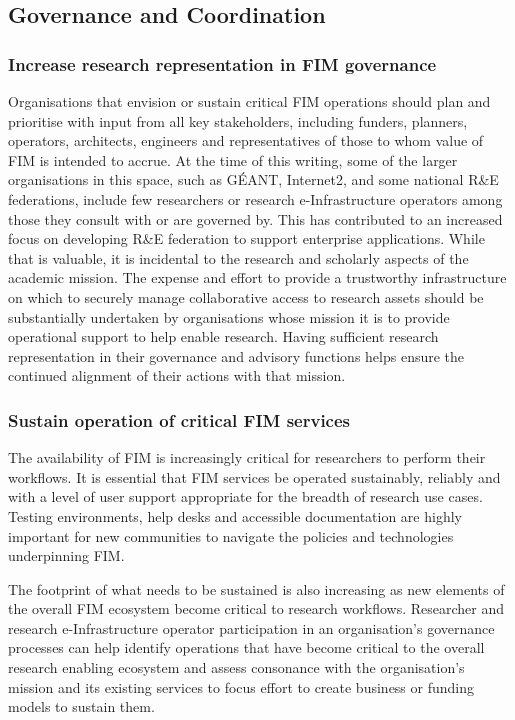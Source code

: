 \documentclass[fleqn,11pt]{wlscirep}
\begin{document}
{\subsection{Governance and Coordination}
\subsubsection{Increase research representation in FIM governance}
Organisations that envision or sustain critical FIM operations should plan and prioritise with input from all key stakeholders, including funders, planners, operators, architects, engineers and representatives of those to whom value of FIM is intended to accrue. At the time of this writing, some of the larger organisations in this space, such as GÉANT, Internet2, and some national R\&E federations, include few researchers or research e-Infrastructure operators among those they consult with or are governed by. This has contributed to an increased focus on developing R\&E federation to support enterprise applications. While that is valuable, it is incidental to the research and scholarly aspects of the academic mission. The expense and effort to provide a trustworthy infrastructure on which to securely manage collaborative access to research assets should be substantially undertaken by organisations whose mission it is to provide operational support to help enable research. Having sufficient research representation in their governance and advisory functions helps ensure the continued alignment of their actions with that mission.
\subsubsection{Sustain operation of critical FIM services}
The availability of FIM is increasingly critical for researchers to perform their workflows. It is essential that FIM services be operated sustainably, reliably and with a level of user support appropriate for the breadth of research use cases. Testing environments, help desks and accessible documentation are highly important for new communities to navigate the policies and technologies underpinning FIM. 

The footprint of what needs to be sustained is also increasing as new elements of the overall FIM ecosystem become critical to research workflows. Researcher and research e-Infrastructure operator participation in an organisation’s governance processes can help identify operations that have become critical to the overall research enabling ecosystem and assess consonance with the organisation’s mission and its existing services to focus effort to create business or funding models to sustain them. 

}
\end{document}
